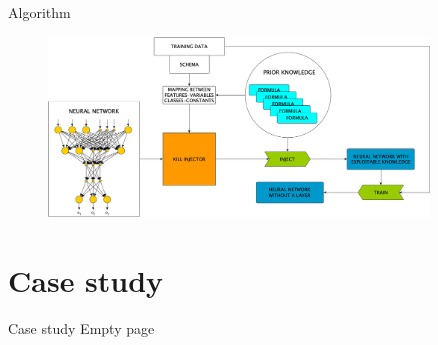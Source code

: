 \documentclass[presentation]{beamer}\mode<presentation>{\usetheme{AMSBolognaFC}}
\begin{document}
\begin{frame}[allowframebreaks]{Algorithm}
    \framebreak
    
    \begin{figure}
        \centering
        \includegraphics[width=0.9\textwidth]{figures/kill.png}
    \end{figure}
    
\end{frame}

\section{Case study}

\begin{frame}[allowframebreaks]{Case study}
    Empty page
\end{frame}

\section*{}

\frame{\titlepage}

\section*{\refname}

\begin{frame}{\refname}
    \scriptsize
    
    
\end{frame}

\end{document}
